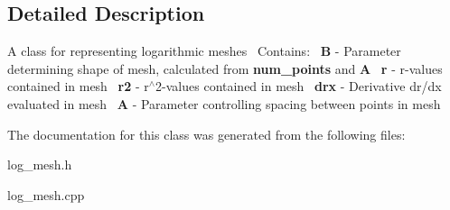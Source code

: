 \subsection{Detailed Description}
A class for representing logarithmic meshes~\newline
Contains\+:~\newline
{\bfseries B} -\/ Parameter determining shape of mesh, calculated from {\bfseries num\+\_\+points} and {\bfseries A}~\newline
{\bfseries r} -\/ r-\/values contained in mesh~\newline
{\bfseries r2} -\/ r$^\wedge$2-\/values contained in mesh~\newline
{\bfseries drx} -\/ Derivative dr/dx evaluated in mesh~\newline
{\bfseries A} -\/ Parameter controlling spacing between points in mesh~\newline


The documentation for this class was generated from the following files\+:\begin{DoxyCompactItemize}
\item 
log\+\_\+mesh.\+h\item 
log\+\_\+mesh.\+cpp\end{DoxyCompactItemize}
